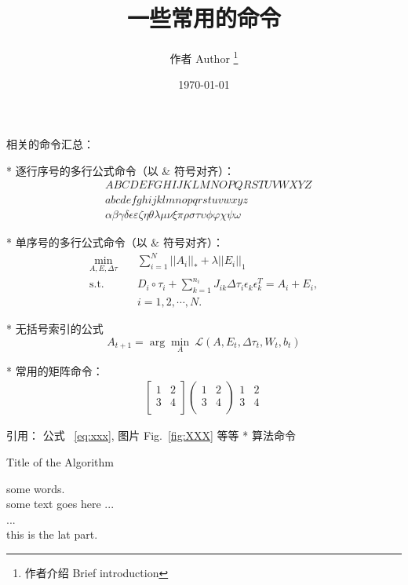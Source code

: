 \documentclass[11pt,a4paper]{article}
\title{一些常用的命令}
\author{ 作者 Author \thanks{作者介绍 Brief introduction} }
\date{\today}
\begin{document}
\maketitle
相关的命令汇总：

* 逐行序号的多行公式命令（以 $\&$ 符号对齐）：
\begin{align}
& ABCDEFGHIJKLMNOPQRSTUVWXYZ \label{eq:alphabet} \\
& abcdefghijklmnopqrstuvwxyz \\
& \alpha \beta \gamma \delta \epsilon \varepsilon \zeta \eta \theta \lambda \mu \nu \xi \pi \rho \sigma \tau \upsilon \phi \varphi \chi \psi \omega  
\end{align}

* 单序号的多行公式命令（以 $\&$ 符号对齐）：
\begin{equation}
\begin{aligned} \label{eq:rasl}
\min_{A,E,\Delta \tau} \quad & \sum_{i=1}^{N}||A_i||_* + \lambda ||E_i||_1  \\
\mathrm{s.t.} \quad & D_i \circ \tau_i + \sum_{k=1}^{n_i} J_{ik} \Delta \tau_i \epsilon_k \epsilon_k^T = A_i + E_i, \\
& i = 1,2,\cdots,N. 
\end{aligned}
\end{equation}

* 无括号索引的公式	
\begin{equation}
A_{t+1} = \arg\min_A \ \mathcal{L}(A,E_t,\Delta\tau_t,W_t,b_t)
\nonumber
\end{equation}
	
* 常用的矩阵命令：
	\begin{align}
	\begin{bmatrix}
	1 & 2 \\
	3 & 4 \\
	\end{bmatrix}
	\begin{pmatrix}
	1 & 2 \\
	3 & 4 \\
	\end{pmatrix}
	\begin{matrix}
	1 & 2 \\
	3 & 4 \\
	\end{matrix}
	\end{align}

引用： 公式 ~\eqref{eq:xxx}, 图片 Fig.~\ref{fig:XXX} 等等
\newpage
* 算法命令
\begin{algorithm}
	\caption{Title of the Algorithm}
	\label{algo:ref}
	\begin{algorithmic}[1]
		\REQUIRE some words.  %
		\ENSURE ~\\           %
		some text goes here ... \\
		\STATE ... \\  %
		\ENDWHILE
		\RETURN this is the lat part.  %
	\end{algorithmic}
\end{algorithm}
\end{document}
